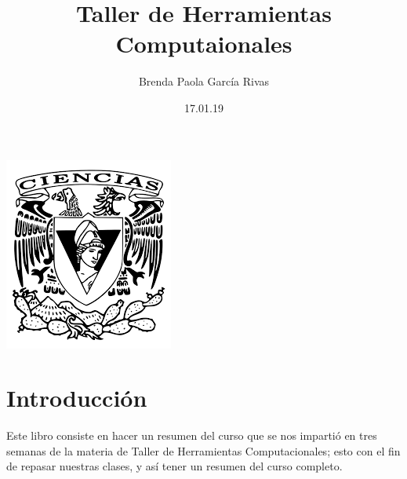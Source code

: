 \documentclass{book}
\title{Taller de Herramientas Computaionales}
\author{Brenda Paola García Rivas}
\date{17.01.19}
\begin{document}
	\maketitle
	\begin{center}
		\includegraphics[scale=1.5]{1.png}
	\end{center}
	\tableofcontents
	\section*{Introducción} Este libro consiste en hacer un resumen del curso que se nos impartió en tres semanas de la materia de Taller de Herramientas Computacionales; esto con el fin de repasar nuestras clases, y así tener un resumen del curso completo.
	
\end{document}
